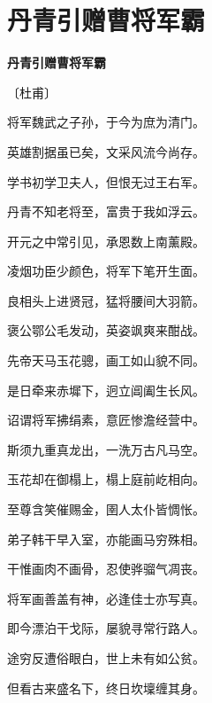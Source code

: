 \documentclass[12pt,UTF-8,openany,fontset=none]{ctexbook}
\begin{document}
\vspace{8pt}
\clearpage

\section{丹青引赠曹将军霸}


\begin{center}
    {\bfseries 丹青引赠曹将军霸}

    \vspace{18pt}

    \begin{large}\xuwen
        〔杜甫〕
    \end{large}

\end{center}

    \vspace{18pt}  %

\begin{center}
    \begin{Large}

        将军魏武之子孙，于今为庶为清门。

        英雄割据虽已矣，文采风流今尚存。

        学书初学卫夫人，但恨无过王右军。

        丹青不知老将至，富贵于我如浮云。

        开元之中常引见，承恩数上南薰殿。

        凌烟功臣少颜色，将军下笔开生面。

        良相头上进贤冠，猛将腰间大羽箭。

        褒公鄂公毛发动，英姿飒爽来酣战。

        先帝天马玉花骢，画工如山貌不同。

        是日牵来赤墀下，迥立阊阖生长风。

        诏谓将军拂绢素，意匠惨澹经营中。

        斯须九重真龙出，一洗万古凡马空。

        玉花却在御榻上，榻上庭前屹相向。

        至尊含笑催赐金，圉人太仆皆惆怅。

        弟子韩干早入室，亦能画马穷殊相。

        干惟画肉不画骨，忍使骅骝气凋丧。

        将军画善盖有神，必逢佳士亦写真。

        即今漂泊干戈际，屡貌寻常行路人。

        途穷反遭俗眼白，世上未有如公贫。

        但看古来盛名下，终日坎壈缠其身。

    \end{Large}

\end{center}
\end{document}
